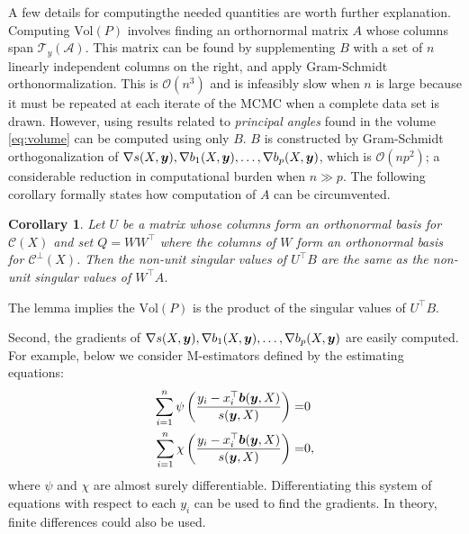 \documentclass[ba]{imsart}
\newcommand{\by}{\mbox{\boldmath $y$}}
\newcommand{\bb}{\mbox{\boldmath $b$}}
\newcommand{\mc}{\mathcal}
\newtheorem{corollary}[theorem]{\bf Corollary}
\begin{document}
A few details for computingthe needed quantities are worth further explanation. Computing $\text{Vol} (P)$ involves finding an orthornormal matrix $A$ whose columns span $\mc T_{y}(\mc A)$. This matrix can be found by supplementing $B$ with a set of $n$ linearly independent columns on the right, and apply Gram-Schmidt orthonormalization.  This is $\mc O(n^3)$ and is infeasibly slow when $n$ is large because it must be repeated at each iterate of the MCMC when a complete data set is drawn.  However, using results related to \textit{principal angles} found in \cite{miao1992} the volume \eqref{eq:volume} can be computed using only $B$. $B$ is constructed by Gram-Schmidt orthogonalization of $\nabla s(X,\by), \nabla b_1(X,\by),\dots, \nabla b_p(X,\by)$, which is  $\mc O(np^2)$;  a 
considerable reduction in computational burden when $n \gg p$. 
The following corollary formally states how computation of $A$ can be circumvented. 
\begin{corollary}
\label{theorem:sings}
Let $U$ be a matrix whose columns form an orthonormal basis for $\mc C (X)$ and set $Q=WW^{\top}$ where the columns of $W$ form an orthonormal basis for $\mc{C}^\perp(X)$. Then the non-unit singular values of $U^\top B$ are the same as the non-unit singular values of $W^\top A$.
\end{corollary} 
\noindent The lemma implies the $\text{Vol} (P)$ is the product of the singular values of $U^\top B$. 

Second, the gradients of $\nabla s(X,\by), \nabla b_1(X,\by),\dots, \nabla b_p(X,\by)$ are easily computed. For example, below we consider M-estimators defined by the estimating equations:
\begin{eqnarray}
\label{Mest}
 \sum_{i=1}^n \psi\left(\frac{y_i - x_{i}^{\top}\bb(\by,X)}{s(\by,X)}\right)= & 0 \\
 \sum_{i=1}^n \chi\left(\frac{y_i - x_{i}^{\top}\bb(\by,X)}{s(\by,X)}\right)= & 0, \nonumber 
\end{eqnarray} 
where $\psi$ and $\chi$ are almost surely differentiable. Differentiating this system of equations with respect to each $y_{i}$ can be used to find the gradients. In theory, finite differences could also be used. 
\end{document}
